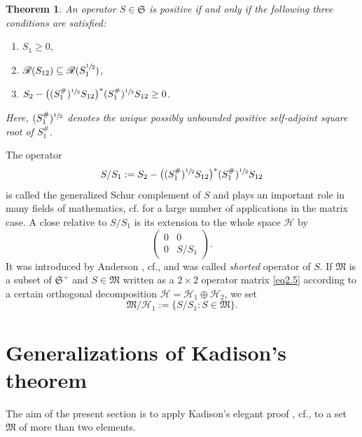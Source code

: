 \documentclass[12pt, a4paper, reqno, twoside]{amsart}
\numberwithin{equation}{section}
\newcommand{\frakS}{\mathfrak S}
\newcommand{\frakM}{\mathfrak M}
\newcommand{\cf}{\mbox{cf.}\xspace}
\newtheorem{theorem}{Theorem}[section]
\theoremstyle{definition}
\theoremstyle{remark}
\theoremstyle{mystyle}
\begin{document}
\begin{theorem}
  \label{thm2.2}
An operator $S\in\frakS$ is positive if and only if the following three
conditions are satisfied:
\begin{enumerate}
\item[\normalfont(i)] $S_{1}\geq0$,  
\item[(ii)] $\mathscr R(S_{12})\subseteq\mathscr R(S_{1}^{\sfrac{1}{2}})$,
\item[(iii)]
$S_{2}-\bigl((S_{1}^{\#})^{\sfrac{1}{2}}S_{12}\bigr)^{\ast}
(S_{1}^{\#})^{\sfrac{1}{2}}S_{12}\geq0$.
\end{enumerate}
Here, $(S_{1}^{\#})^{\sfrac{1}{2}}$ denotes the unique possibly unbounded
positive self-adjoint square root of $S_{1}^{\#}$.
\end{theorem}

The operator
\begin{equation}
  \label{eq2.6}
 S/S_{1} := S_{2}-\bigl((S_{1}^{\#})^{\sfrac{1}{2}}S_{12}\bigr)^{\ast}
(S_{1}^{\#})^{\sfrac{1}{2}}S_{12} 
\end{equation}
is called the generalized Schur complement of $S$ and plays an important
role in many fields of mathematics, \cf \cite{Zhang2005} for a large
number of applications in the matrix case. A close relative to
$S/S_{1}$ is its extension to the whole space $\mathscr H$ by
\[
  \begin{pmatrix} 0 & 0 \\ 0 & S/S_{1} \end{pmatrix}.
\]  
It was introduced by Anderson \cite{Anderson1971,AndersonTrapp1975},
\cf \cite{Shmulyan1959}, and was called \emph{shorted} operator of
$S$. If  $\frakM$ is a subset of $\frakS^{+}$ and $S\in\frakM$ written
as a $2\times2$ operator matrix \eqref{eq2.5} according to a certain
orthogonal decomposition
$\mathscr H = \mathscr H_{1} \oplus \mathscr H_{2}$, we set
\begin{equation}
  \label{eq2.7}
  \frakM/\mathscr H_{1} := \bigl\{ S/S_{1} : S\in\frakM \bigr\}.
\end{equation}

\section{Generalizations of Kadison's theorem}
\label{sec3}

The aim of the present section is to apply Kadison's elegant  proof
\cite{Kadison1951}, \cf \cite[Ex.~2.8.18]{KadisonRingrose1983}, to a
set $\frakM$ of more than two elements.
\end{document}
